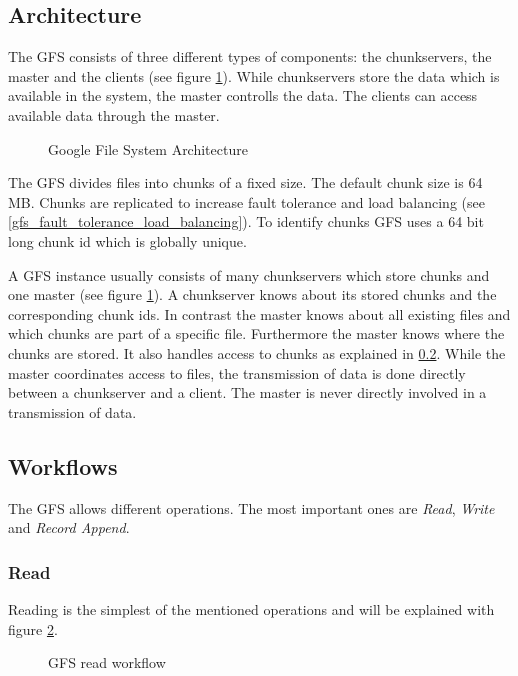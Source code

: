 \documentclass{sig-alternate}
\begin{document}
\subsection{Architecture}
The GFS consists of three different types of components: the chunkservers, the master and the clients (see figure \ref{fig:gfs_architecture}). While chunkservers store the data which is available in the system, the master controlls the data. The clients can access available data through the master.

\begin{figure}[!hbt]
\centering
{}
\caption{Google File System Architecture}
\label{fig:gfs_architecture}
\end{figure}

The GFS divides files into chunks of a fixed size. The default chunk size is 64 MB.
Chunks are replicated to increase fault tolerance and load balancing (see \ref{gfs_fault_tolerance_load_balancing}). To identify chunks GFS uses a 64 bit long chunk id which is globally unique.~\cite{google1}

A GFS instance usually consists of many chunkservers which store chunks and one master (see figure \ref{fig:gfs_architecture}). A chunkserver knows about its stored chunks and the corresponding chunk ids. In contrast the master knows about all existing files and which chunks are part of a specific file. Furthermore the master knows where the chunks are stored. It also handles access to chunks as explained in \ref{gfs_workflows}. While the master coordinates access to files, the transmission of data is done directly between a chunkserver and a client. The master is never directly involved in a transmission of data.

\subsection{Workflows}
\label{gfs_workflows}
The GFS allows different operations. The most important ones are \textit{Read}, \textit{Write} and \textit{Record Append}.

\subsubsection{Read}
Reading is the simplest of the mentioned operations and will be explained with figure \ref{fig:gfs_read}.

\begin{figure}[!hbt]
\centering
{}
\caption{GFS read workflow}
\label{fig:gfs_read}
\end{figure}
\end{document}
